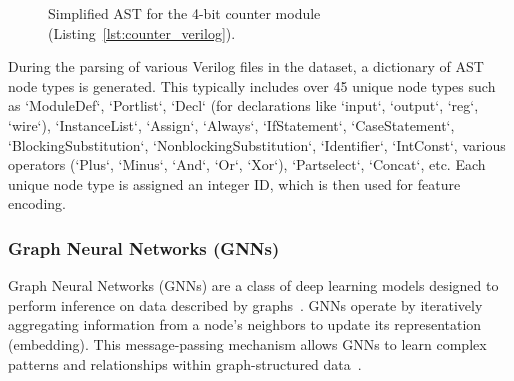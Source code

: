 \documentclass[sigplan,screen]{acmart}
\begin{document}
\begin{figure}[htbp] %
\centering
{}
\caption{Simplified AST for the 4-bit counter module (Listing~\ref{lst:counter_verilog}).}
\label{fig:ast_example}
\end{figure}

During the parsing of various Verilog files in the dataset, a dictionary of AST node types is generated. This typically includes over 45 unique node types such as `ModuleDef`, `Portlist`, `Decl` (for declarations like `input`, `output`, `reg`, `wire`), `InstanceList`, `Assign`, `Always`, `IfStatement`, `CaseStatement`, `BlockingSubstitution`, `NonblockingSubstitution`, `Identifier`, `IntConst`, various operators (`Plus`, `Minus`, `And`, `Or`, `Xor`), `Partselect`, `Concat`, etc. Each unique node type is assigned an integer ID, which is then used for feature encoding.

\subsubsection{Graph Neural Networks (GNNs)}
Graph Neural Networks (GNNs) are a class of deep learning models designed to perform inference on data described by graphs~\cite{zhou2020graph}. GNNs operate by iteratively aggregating information from a node's neighbors to update its representation (embedding). This message-passing mechanism allows GNNs to learn complex patterns and relationships within graph-structured data~\cite{wu2020comprehensive}.
\end{document}
